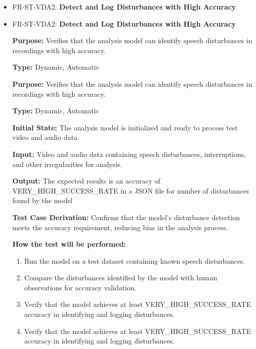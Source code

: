 \documentclass[12pt, titlepage]{article}
\begin{document}
\begin{itemize}
  \item FR-ST-VDA2: \textbf{Detect and Log Disturbances with High Accuracy}
  \item FR-ST-VDA2: \textbf{Detect and Log Disturbances with High Accuracy}
  \begin{mdframed}[linewidth=0.5mm]
      \textbf{Purpose:} Verifies that the analysis model can identify speech disturbances in recordings with high accuracy. \par
      \textbf{Type:} Dynamic, Automatic \par
      \textbf{Purpose:} Verifies that the analysis model can identify speech disturbances in recordings with high accuracy. \par
      \textbf{Type:} Dynamic, Automatic \par
      \textbf{Initial State:} The analysis model is initialized and ready to process test video and audio data. \par
      \textbf{Input:} Video and audio data containing speech disturbances, interruptions, and other irregularities for analysis. \par
      \textbf{Output:} The expected results is an accuracy of VERY\_HIGH\_SUCCESS\_RATE in a JSON file for number of disturbances found by the model \par
      \textbf{Test Case Derivation:} Confirms that the model’s disturbance detection meets the accuracy requirement, reducing bias in the analysis process. \par
      \textbf{How the test will be performed:}
      \begin{enumerate}[noitemsep]
        \item Run the model on a test dataset containing known speech disturbances.
        \item Compare the disturbances identified by the model with human observations for accuracy validation.
        \item Verify that the model achieves at least VERY\_HIGH\_SUCCESS\_RATE \\ accuracy in identifying and logging disturbances.
        \item Verify that the model achieves at least VERY\_HIGH\_SUCCESS\_RATE \\ accuracy in identifying and logging disturbances.
      \end{enumerate}
  \end{mdframed}


\end{itemize}
\end{document}
